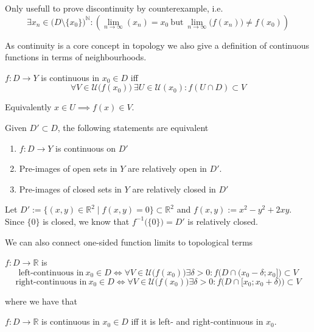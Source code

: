 \begin{remark}[Tips]
   Only usefull to prove discontinuity by counterexample, i.e.
   \[\exists x_n \in \big(D\setminus\{x_0\}\big)^\mathbb{N}: \left(\lim_{n \to \infty}(x_n) = x_0~\text{but}~\lim_{n \to \infty}\big(f(x_n)\big) \neq f(x_0)\right)\]
\end{remark}
As continuity is a core concept in topology we also give a definition of continuous functions in terms of neighbourhoods.
\begin{definition}\label{def:neigh_cont}
   \(f: D \to Y\) is continuous in \(x_0 \in D\) iff
   \[\forall V \in \mathcal{U}\big(f(x_0)\big)~\exists U \in \mathcal{U}(x_0): f(U \cap D) \subset V\]
\end{definition}
\begin{remark}
   Equivalently \(x \in U \implies f(x) \in V\).
\end{remark}

\begin{theorem}
   Given \(D' \subset D\), the following statements are equivalent
   \begin{enumerate}[label=\roman*, align=Center]
      \item \(f: D \to Y\) is continuous on \(D'\)
      \item Pre-images of open sets in \(Y\) are relatively open in \(D'\).
      \item Pre-images of closed sets in \(Y\) are relatively closed in \(D'\)
   \end{enumerate}
\end{theorem}
\begin{example}
   Let \(D' := \{(x, y) \in \mathbb{R}^2 \mid f(x,y) = 0\} \subset \mathbb{R}^2\) and \(f(x,y) := x^2-y^2 + 2xy\).
   Since \(\{0\}\) is closed, we know that \(f^{-1}\big(\{0\}\big) = D'\) is relatively closed.
\end{example}
We can also connect one-sided function limits to topological terms
\begin{definition}
   \(f: D \to \mathbb{R}\) is
   \[\text{left-continuous in}~x_0 \in D \iff \forall V \in \mathcal{U}\big(f(x_0)\big) \exists \delta > 0: f\big(D \cap (x_0 - \delta; x_0]\big) \subset V\]
   \[\text{right-continuous in}~x_0 \in D \iff \forall V \in \mathcal{U}\big(f(x_0)\big) \exists \delta > 0: f\big(D \cap [x_0; x_0 + \delta)\big) \subset V\]
\end{definition}
where we have that
\begin{proposition}
   \(f: D \to \mathbb{R}\) is continuous in \(x_0 \in D\) iff it is left- and right-continuous in \(x_0\).
\end{proposition}

